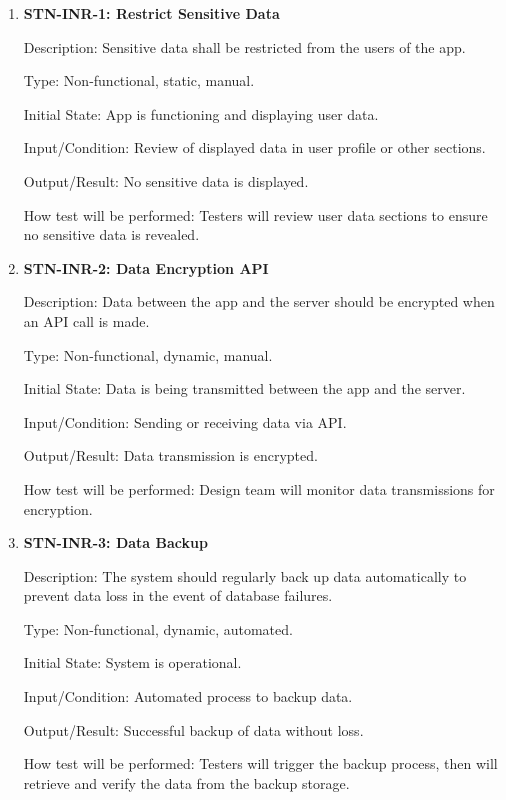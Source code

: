 \documentclass[12pt, titlepage]{article}
\begin{document}
    \begin{enumerate}

        \item {\textbf{STN-INR-1: Restrict Sensitive Data}}

        Description: Sensitive data shall be restricted from the users of the app.

        Type: Non-functional, static, manual.

        Initial State: App is functioning and displaying user data.

        Input/Condition: Review of displayed data in user profile or other sections.

        Output/Result: No sensitive data is displayed.

        How test will be performed: Testers will review user data sections to ensure no sensitive data is revealed.

        \item{\textbf{STN-INR-2: Data Encryption API}}

        Description:  Data between the app and the server should be encrypted when an API call is made.

        Type: Non-functional, dynamic, manual.

        Initial State: Data is being transmitted between the app and the server.

        Input/Condition: Sending or receiving data via API.

        Output/Result: Data transmission is encrypted.

        How test will be performed: Design team will monitor data transmissions for encryption.


        \item \textbf{{STN-INR-3: Data Backup}}

        Description: The system should regularly back up data automatically to prevent data loss in the event of database failures.

        Type: Non-functional, dynamic, automated.

        Initial State: System is operational.

        Input/Condition: Automated process to backup data.

        Output/Result: Successful backup of data without loss.

        How test will be performed: Testers will trigger the backup process, then will retrieve and verify the data from the backup storage.


\end{enumerate}
\end{document}
